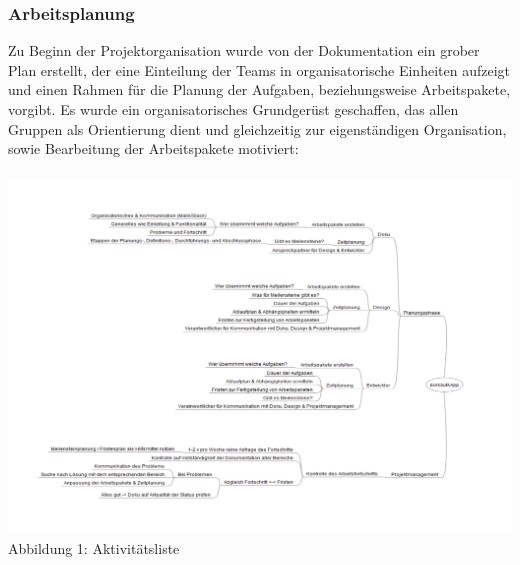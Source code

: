 \documentclass[12pt,a4paper]{article}
\begin{document}
\subsubsection{Arbeitsplanung}
Zu Beginn der Projektorganisation wurde von der Dokumentation ein grober Plan erstellt, der eine Einteilung der Teams in organisatorische Einheiten aufzeigt und einen Rahmen für die Planung der Aufgaben, beziehungsweise Arbeitspakete, vorgibt. 
Es wurde ein organisatorisches Grundgerüst geschaffen, das allen Gruppen als Orientierung dient und gleichzeitig zur eigenständigen Organisation, sowie Bearbeitung der Arbeitspakete motiviert:
\\
\\
\hspace*{-10mm} \includegraphics[trim = 20mm 0mm 0mm 20mm,clip,scale=0.7]{Aktivitaetsliste.pdf}
\\
\footnotesize Abbildung 1: Aktivitätsliste
\normalsize
\\
\linebreak
\end{document}
